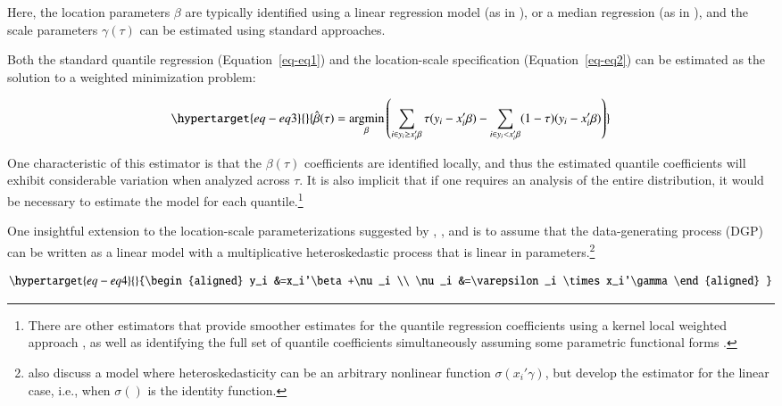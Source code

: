 \documentclass[
  authoryear,
  preprint,
  1p]{elsarticle}
\begin{document}
Here, the location parameters \(\beta\) are typically identified using a
linear regression model (as in \citet{mss2019}), or a median regression
(as in \citet{melly2005}), and the scale parameters \(\gamma(\tau)\) can
be estimated using standard approaches.

Both the standard quantile regression (Equation~\ref{eq-eq1}) and the
location-scale specification (Equation~\ref{eq-eq2}) can be estimated as
the solution to a weighted minimization problem:

\begin{equation}\protect\hypertarget{eq-eq3}{}{\hat{\beta}(\tau) = \underset{\beta}{\operatorname{argmin}}
\left( \sum_{i\in y_i\geq x_i'\beta} \tau (y_i - x_i'\beta) - \sum_{i\in y_i<x_i'\beta} (1-\tau)(y_i - x_i'\beta) \right)
}\label{eq-eq3}\end{equation}

One characteristic of this estimator is that the \(\beta(\tau)\)
coefficients are identified locally, and thus the estimated quantile
coefficients will exhibit considerable variation when analyzed across
\(\tau\). It is also implicit that if one requires an analysis of the
entire distribution, it would be necessary to estimate the model for
each quantile.\footnote{There are other estimators that provide smoother
  estimates for the quantile regression coefficients using a kernel
  local weighted approach \citep{kaplan2017}, as well as identifying the
  full set of quantile coefficients simultaneously assuming some
  parametric functional forms \citep{frumentobotai2016}.}

One insightful extension to the location-scale parameterizations
suggested by \citet{he1997}, \citet{cameron2005}, and \citet{mss2019} is
to assume that the data-generating process (DGP) can be written as a
linear model with a multiplicative heteroskedastic process that is
linear in parameters.\footnote{\citet{mss2019} also discuss a model
  where heteroskedasticity can be an arbitrary nonlinear function
  \(\sigma(x_i'\gamma)\), but develop the estimator for the linear case,
  i.e., when \(\sigma()\) is the identity function.}

\begin{equation}\protect\hypertarget{eq-eq4}{}{\begin{aligned}
y_i &=x_i'\beta+\nu_i \\
\nu_i &=\varepsilon_i \times x_i'\gamma 
\end{aligned}
}\label{eq-eq4}\end{equation}
\end{document}
